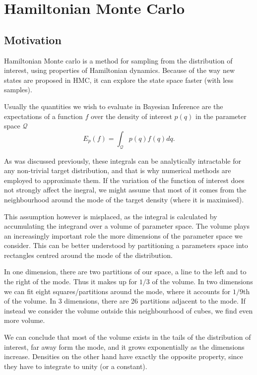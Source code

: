 \section{Hamiltonian Monte Carlo}
\label{section:hmc}
\subsection{Motivation}

Hamiltonian Monte carlo is a method for sampling from the distribution of interest, using properties of Hamiltonian dynamics. Because of the way new states are proposed in HMC, it can explore the state space faster (with less samples).

Usually the quantities we wish to evaluate in Bayesian Inference are the expectations of a function $f$ over the density of interest $p(q)$ in the parameter space $\mathcal{Q}$
\begin{equation}
	E_p(f) = \int_{\mathcal{Q}}p(q)f(q)dq.
\end{equation}

As was discussed previously, these integrals can be analytically intractable for any non-trivial target distribution, and that is why numerical methods are employed to approximate them. If the variation of the function of interest does not strongly affect the inegral, we might assume that most of it comes from the neighbourhood around the mode of the target density (where it is maximised).

This assumption however is misplaced, as the integral is calculated by accumulating the integrand over a volume of parameter space. The volume plays an increasingly important role the more dimensions of the parameter space we consider. This can be better understood by partitioning a parameters space into rectangles centred around the mode of the distribution. 

In one dimension, there are two partitions of our space, a line to the left and to the right of the mode. Thus it makes up for $1/3$ of the volume. In two dimensions we can fit eight squares/partitions around the mode, where it accounts for $1/9$th of the volume. In 3 dimensions, there are 26 partitions adjacent to the mode. If instead we consider the volume outside this neighbourhood of cubes, we find even more volume. 

We can conclude that most of the volume exists in the tails of the distribution of interest, far away form the mode, and it grows exponentially as the dimensions increase. Densities on the other hand have exactly the opposite property, since they have to integrate to unity (or a constant). 


